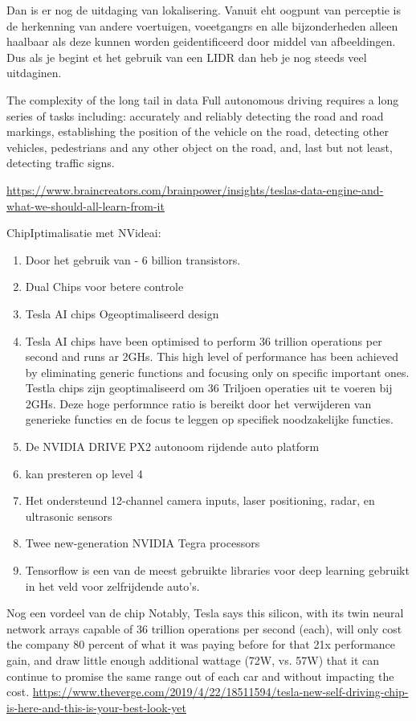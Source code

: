 \documentclass{article}
\begin{document}
Dan  is er nog de uitdaging van lokalisering. Vanuit eht oogpunt van perceptie is de herkenning van andere voertuigen, voeetgangrs en alle bijzonderheden alleen haalbaar als deze kunnen worden geidentificeerd door middel van afbeeldingen. Dus als je begint et het gebruik van een LIDR dan heb je nog steeds veel uitdaginen.

The complexity of the long tail in data
Full autonomous driving requires a long series of tasks including: accurately and reliably detecting the road and road markings, establishing the position of the vehicle on the road, detecting other vehicles, pedestrians and any other object on the road, and, last but not least, detecting traffic signs.



\url{https://www.braincreators.com/brainpower/insights/teslas-data-engine-and-what-we-should-all-learn-from-it}

ChipIptimalisatie met NVideai:
\begin{enumerate}
\item Door het gebruik van - 6 billion transistors.
\item Dual Chips voor betere controle
\item Tesla AI chips Ogeoptimaliseerd design
\item Tesla AI chips have been optimised to perform 36 trillion operations per second and runs ar 2GHs. This high level of performance has been achieved by eliminating generic functions and focusing only on specific important ones. Testla chips zijn geoptimaliseerd om 36 Triljoen operaties uit te voeren bij 2GHs. Deze hoge performnce ratio is bereikt door het verwijderen van generieke functies en de focus te leggen op specifiek noodzakelijke functies.
\item De NVIDIA DRIVE PX2 autonoom rijdende auto platform
\item kan presteren op level 4
\item Het ondersteund 12-channel camera inputs, laser positioning, radar, en  ultrasonic sensors
\item Twee new-generation NVIDIA Tegra processors 
\item Tensorflow is een van de meest gebruikte libraries voor deep learning gebruikt in het veld voor  zelfrijdende auto's.
\end{enumerate}
Nog een vordeel van de chip
Notably, Tesla says this silicon, with its twin neural network arrays capable of 36 trillion operations per second (each), will only cost the company 80 percent of what it was paying before for that 21x performance gain, and draw little enough additional wattage (72W, vs. 57W) that it can continue to promise the same range out of each car and without impacting the cost.
\url{https://www.theverge.com/2019/4/22/18511594/tesla-new-self-driving-chip-is-here-and-this-is-your-best-look-yet}
\end{document}
